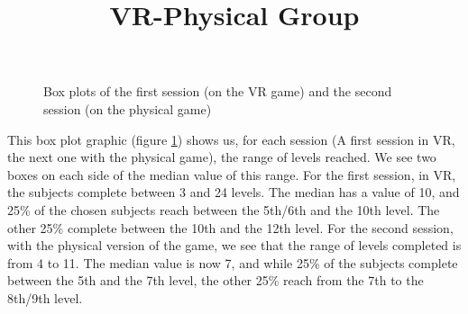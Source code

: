 \documentclass[12pt, openany, twocolumn]{article}
\begin{document}
            \noindent \title{\textbf{VR-Physical Group}}
                \begin{figure}[H]
                    \centering
                    \setlength{\fboxsep}{0pt}
                    \caption{Box plots of the first session (on the VR game) and the second session (on the physical game)}
                    \label{figure13}
                \end{figure}

            This box plot graphic (figure \ref{figure13}) shows us, for each session (A first session in VR, the next one with the physical game), the range of levels reached. We see two boxes on each side of the median value of this range.
            For the first session, in VR, the subjects complete between 3 and 24 levels. The median has a value of 10, and 25\% of the chosen subjects reach between the 5th/6th and the 10th level. The other 25\% complete between the 10th and the 12th level.
            For the second session, with the physical version of the game, we see that the range of levels completed is from 4 to 11. The median value is now 7, and while 25\% of the subjects complete between the 5th and the 7th level, the other 25\% reach from the 7th to the 8th/9th level.
\end{document}

